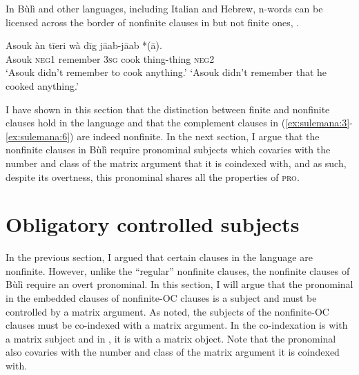 \documentclass[output=paper,colorlinks,citecolor=brown]{langscibook}
\begin{document}
In Bùlì and other languages, including Italian and Hebrew, n-words can be licensed across the border of nonfinite clauses in but not finite ones, . 

\ea%
    \label{ex:sulemana:15}
    \ea%
    \label{ex:sulemana:15a}
    \gll    Asouk àn tīeri  wà dīg jāab-jāab  *(ā).\\
            Asouk  \textsc{neg1}  remember \textsc{3sg} cook thing-thing  \textsc{neg2} \\
    \glt    `Asouk didn't remember to cook anything.'
    \glt    `Asouk didn't remember that he cooked anything.' 
    \z
\z

I have shown in this section that the distinction between finite and nonfinite clauses hold in the language and that the complement clauses in (\ref{ex:sulemana:3}-\ref{ex:sulemana:6})  are indeed nonfinite. 
In the next section, I  argue that the nonfinite clauses in Bùlì require pronominal subjects which covaries with the number and class of the matrix argument that it is coindexed with, and as such, despite its overtness, this pronominal shares all the properties of \textsc{pro}. 

\section{Obligatory controlled subjects}\label{sec:sulemana:4}

In the previous section, I argued that certain clauses in the language are nonfinite. However, unlike the ``regular'' nonfinite clauses, the nonfinite clauses of Bùlì require an overt pronominal. In this section, I will argue that the pronominal in the embedded clauses of nonfinite-OC clauses is a subject and must be controlled by a matrix argument.  As noted, the subjects of the nonfinite-OC clauses must be co-indexed with a matrix argument. In  the co-indexation is with a matrix subject and in , it is with a matrix object. Note that the pronominal also covaries with the number and class of the matrix argument it is coindexed with. 
\end{document}
